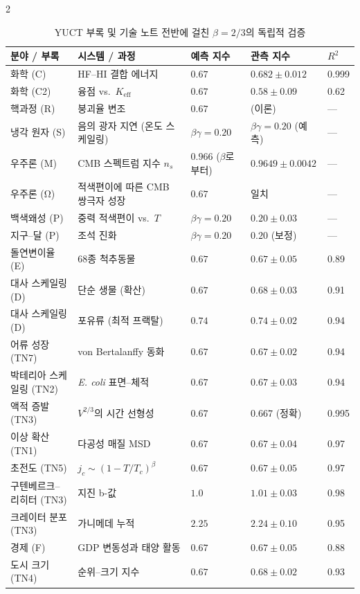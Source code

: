 \documentclass[11pt,a4paper]{article}
\newcommand{\betaf}{\beta}
\begin{document}
\begin{multicols}{2}
		\begin{table}[htbp]
			\centering
			\caption{YUCT 부록 및 기술 노트 전반에 걸친 \(\betaf = 2/3\)의 독립적 검증}
			\label{tab:full}
			\footnotesize
			\begin{tabular}{p{3.5cm}p{5.0cm}p{2.1cm}p{3.5cm}p{1.4cm}}
				\toprule
				\textbf{분야 / 부록} & \textbf{시스템 / 과정} & \textbf{예측 지수} & \textbf{관측 지수} & \(R^2\) \\
				\midrule
				화학 (C) & HF--HI 결합 에너지 & \(0.67\) & \(0.682 \pm 0.012\) & 0.999 \\
				화학 (C2) & 융점 vs.\ \(K_{\mathrm{eff}}\) & \(0.67\) & \(0.58 \pm 0.09\) & 0.62 \\
				핵과정 (R) & 붕괴율 변조 & \(0.67\) & (이론) & — \\
				냉각 원자 (S) & 음의 광자 지연 (온도 스케일링) & \(\beta\gamma = 0.20\) & \(\beta\gamma = 0.20\) (예측) & — \\
				우주론 (M) & CMB 스펙트럼 지수 \(n_s\) & \(0.966\) (\(\beta\)로부터) & \(0.9649 \pm 0.0042\) & — \\
				우주론 (Ω) & 적색편이에 따른 CMB 쌍극자 성장 & \(0.67\) & 일치 & — \\
				백색왜성 (P) & 중력 적색편이 vs.\ \(T\) & \(\beta\gamma = 0.20\) & \(0.20 \pm 0.03\) & — \\
				지구--달 (P) & 조석 진화 & \(\beta\gamma = 0.20\) & \(0.20\) (보정) & — \\
				돌연변이율 (E) & 68종 척추동물 & \(0.67\) & \(0.67 \pm 0.05\) & 0.89 \\
				대사 스케일링 (D) & 단순 생물 (확산) & \(0.67\) & \(0.68 \pm 0.03\) & 0.91 \\
				대사 스케일링 (D) & 포유류 (최적 프랙탈) & \(0.74\) & \(0.74 \pm 0.02\) & 0.94 \\
				어류 성장 (TN7) & von Bertalanffy 동화 & \(0.67\) & \(0.67 \pm 0.02\) & 0.94 \\
				박테리아 스케일링 (TN2) & \emph{E. coli} 표면--체적 & \(0.67\) & \(0.67 \pm 0.03\) & 0.94 \\
				액적 증발 (TN3) & \(V^{2/3}\)의 시간 선형성 & \(0.67\) & \(0.667\) (정확) & 0.995 \\
				이상 확산 (TN1) & 다공성 매질 MSD & \(0.67\) & \(0.67 \pm 0.04\) & 0.97 \\
				초전도 (TN5) & \(j_c \sim (1-T/T_c)^{\beta}\) & \(0.67\) & \(0.67 \pm 0.05\) & 0.97 \\
				구텐베르크--리히터 (TN3) & 지진 b-값 & \(1.0\) & \(1.01 \pm 0.03\) & 0.98 \\
				크레이터 분포 (TN3) & 가니메데 누적 & \(2.25\) & \(2.24 \pm 0.10\) & 0.95 \\
				경제 (F) & GDP 변동성과 태양 활동 & \(0.67\) & \(0.67 \pm 0.05\) & 0.88 \\
				도시 크기 (TN4) & 순위--크기 지수 & \(0.67\) & \(0.68 \pm 0.02\) & 0.93 \\
				\bottomrule
			\end{tabular}
		\end{table}
		

\end{multicols}
\end{document}
